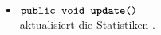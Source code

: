 \begin{description}
\begin{itemize}
				\item $\texttt{public void \textbf{update}()}$ \\ aktualisiert die Statistiken .
				
				
					
			
		
	\end{itemize}
\end{description}

